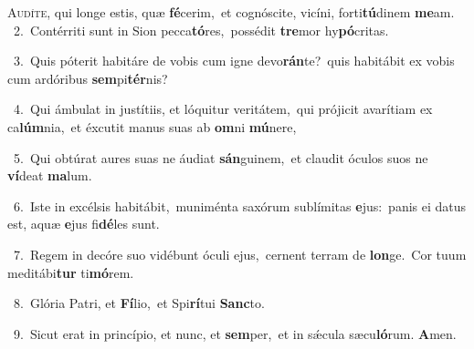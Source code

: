 \lettrine{\initial\textcolor{\initialcolor}{A}}{udíte,} qui longe estis, quæ \textbf{fé}\-cerim,~\star et cognóscite, vicíni, forti\-\textbf{tú}\-dinem \textbf{me}\-am.\\
{\numbfont\textcolor{\numbcolor}{~2.}}~Contérriti sunt in Sion pecca\-\textbf{tó}\-res,~\star possédit \textbf{tre}\-mor hy\-\textbf{pó}\-critas.\par
{\numbfont\textcolor{\numbcolor}{~3.}}~Quis póterit habitáre de vobis cum igne devo\-\textbf{rán}\-te?~\star quis habitábit ex vobis cum ardóribus \textbf{sem}\-pi\-\textbf{tér}\-nis?\par
{\numbfont\textcolor{\numbcolor}{~4.}}~Qui ámbulat in justítiis, et lóquitur veritátem,~\dagger qui prójicit avarítiam ex ca\-\textbf{lúm}\-nia,~\star et éxcutit manus suas ab \textbf{om}\-ni \textbf{mú}\-nere,\par
{\numbfont\textcolor{\numbcolor}{~5.}}~Qui obtúrat aures suas ne áudiat \textbf{sán}\-guinem,~\star et claudit óculos suos ne \textbf{ví}\-deat \textbf{ma}\-lum.\par
{\numbfont\textcolor{\numbcolor}{~6.}}~Iste in excélsis habitábit,~\dagger muniménta saxórum sublímitas \textbf{e}\-jus:~\star panis ei datus est, aquæ \textbf{e}\-jus fi\-\textbf{dé}\-les sunt.\par
{\numbfont\textcolor{\numbcolor}{~7.}}~Regem in decóre suo vidébunt óculi ejus,~\dagger cernent terram de \textbf{lon}\-ge.~\star Cor tuum meditábi\textbf{tur} ti\-\textbf{mó}\-rem.\par
{\numbfont\textcolor{\numbcolor}{~8.}}~Glória Patri, et \textbf{Fí}\-lio,~\star et Spi\-\textbf{rí}\-tui \textbf{Sanc}\-to.\par
{\numbfont\textcolor{\numbcolor}{~9.}}~Sicut erat in princípio, et nunc, et \textbf{sem}\-per,~\star et in sǽcula sæcu\-\textbf{ló}\-rum. \textbf{A}\-men.\par
